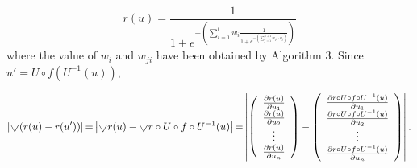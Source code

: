 $$r(u) = \frac{1}{{1 + {e^{ - (\sum\limits_{i = 1}^l {{w_i}\frac{1}{{1 + {e^{ - (\sum\limits_{j = 1}^{n+1} {{w_{ji}}\cdot{u_j}} )}}}}} )}}}}$$
where the value of $w_i$ and $w_{ji}$ have been obtained by Algorithm 3.
Since  $u' = U \circ f({U^{ - 1}}(u))$, 

\begin{equation}\label{equ:|r(u)-r(u')|}
\left|\bigtriangledown {(r(u) - r(u'))} \right|{\rm{ = }}\left| {\bigtriangledown r(u) - \bigtriangledown r \circ U \circ f \circ {U^{ - 1}}(u)} \right|{\rm{ = }}\left| {\left( \begin{array}{c}
	\frac{{\partial r(u)}}{{\partial {u_1}}}\\
	\frac{{\partial r(u)}}{{\partial {u_2}}}\\
	\vdots \\
	\frac{{\partial r(u)}}{{\partial {u_n}}}
	\end{array} \right) - \left( \begin{array}{c}
	\frac{{\partial r \circ U \circ f \circ {U^{ - 1}}(u)}}{{\partial {u_1}}}\\
	\frac{{\partial r \circ U \circ f \circ {U^{ - 1}}(u)}}{{\partial {u_2}}}\\
	\vdots \\
	\frac{{\partial r \circ U \circ f \circ {U^{ - 1}}(u)}}{{\partial {u_n}}}
	\end{array} \right)} \right|.
\end{equation}

